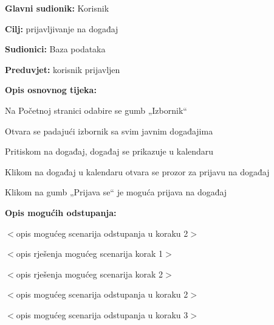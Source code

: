 	\noindent {}
\begin{packed_item}
	
	\item \textbf{Glavni sudionik: }Korisnik
	\item  \textbf{Cilj:} prijavljivanje na događaj
	\item  \textbf{Sudionici:}
	Baza podataka
	\item  \textbf{Preduvjet:} korisnik prijavljen
	\item  \textbf{Opis osnovnog tijeka:}
	
	\item[] \begin{packed_enum}
		
		\item	Na Početnoj stranici odabire se gumb „Izbornik“ 
		\item	Otvara se padajući izbornik sa svim javnim događajima
		\item	Pritiskom na događaj, događaj se prikazuje u kalendaru
		\item	Klikom na događaj u kalendaru otvara se prozor za prijavu na događaj
		\item	Klikom na gumb „Prijava se“  je moguća prijava na događaj
		
	\end{packed_enum}
	
	\item  \textbf{Opis mogućih odstupanja:}
	
	\item[] \begin{packed_item}
		
		\item[2.a] $<$opis mogućeg scenarija odstupanja u koraku 2$>$
		\item[] \begin{packed_enum}
			
			\item $<$opis rješenja mogućeg scenarija korak 1$>$
			\item $<$opis rješenja mogućeg scenarija korak 2$>$
			
		\end{packed_enum}
		\item[2.b] $<$opis mogućeg scenarija odstupanja u koraku 2$>$
		\item[3.a] $<$opis mogućeg scenarija odstupanja  u koraku 3$>$
		
	\end{packed_item}
\end{packed_item}

